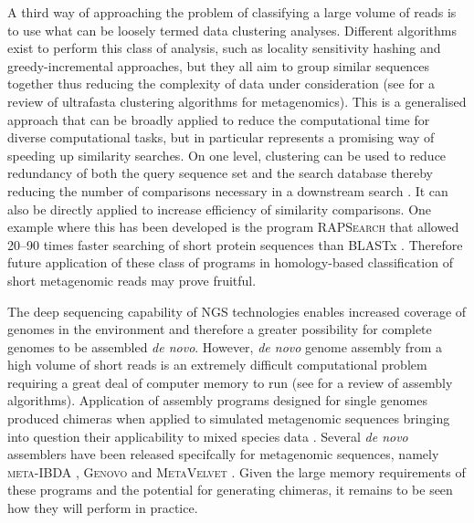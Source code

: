 A third way of approaching the problem of classifying a large volume of reads is to use what can be loosely termed data clustering analyses.
Different algorithms exist to perform this class of analysis, such as locality sensitivity hashing and greedy-incremental approaches, but they all aim to group similar sequences together thus reducing the complexity of data under consideration (see \citet{Li2012} for a review of ultrafasta clustering algorithms for metagenomics).
This is a generalised approach that can be broadly applied to reduce the computational time for diverse computational tasks, but in particular represents a promising way of speeding up similarity searches.
On one level, clustering can be used to reduce redundancy of both the query sequence set and the search database thereby reducing the number of comparisons necessary in a downstream search \cite{Li2012}.
It can also be directly applied to increase efficiency of similarity comparisons.
One example where this has been developed is the program \textsc{RAPSearch} that allowed 20--90 times faster searching of short protein sequences than \ac{BLAST}x \cite{Ye2011}.
Therefore future application of these class of programs in homology-based classification of short metagenomic reads may prove fruitful.

The deep sequencing capability of \ac{NGS} technologies enables increased coverage of genomes in the environment and therefore a greater possibility for complete genomes to be assembled \emph{de novo}.
However, \emph{de novo} genome assembly from a high volume of short reads is an extremely difficult computational problem requiring a great deal of computer memory to run (see \citet{Salzberg2012} for a review of assembly algorithms).
Application of assembly programs designed for single genomes produced chimeras when applied to simulated metagenomic sequences bringing into question their applicability to mixed species data \cite{Pignatelli2011}.
Several \emph{de novo} assemblers have been released specifcally for metagenomic sequences, namely \textsc{meta-IBDA} \cite{Peng2011}, \textsc{Genovo} \cite{Laserson2011} and \textsc{MetaVelvet} \cite{Namiki2012}.
Given the large memory requirements of these programs and the potential for generating chimeras, it remains to be seen how they will perform in practice.


